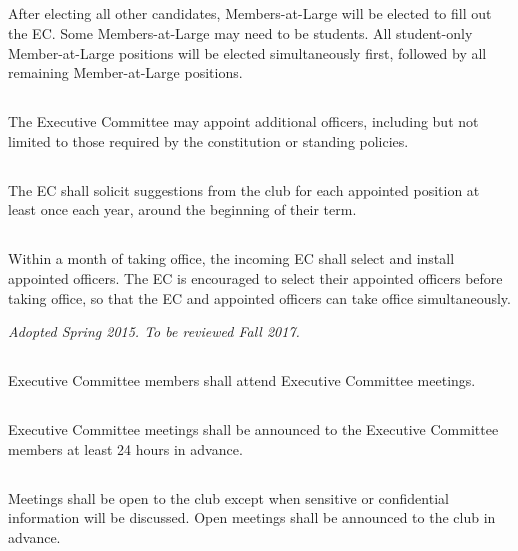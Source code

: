 \documentclass{bylaws}
\newcommand{\sptimes}[2]{\emph{Adopted #1. To be reviewed #2.}}
\begin{document}
\subsection{}After electing all other candidates, Members-at-Large will be elected to fill out the EC. Some Members-at-Large may need to be students. All student-only Member-at-Large positions will be elected simultaneously first, followed by all remaining Member-at-Large positions. 


\subsection{}The Executive Committee may appoint additional officers, including but not limited to those required by the constitution or standing policies.
\subsection{}The EC shall solicit suggestions from the club for each appointed position at least once each year, around the beginning of their term.
\subsection{}Within a month of taking office, the incoming EC shall select and install appointed officers. The EC is encouraged to select their appointed officers before taking office, so that the EC and appointed officers can take office simultaneously.


\sptimes{Spring 2015}{Fall 2017}


\subsection{}Executive Committee members shall attend Executive Committee meetings.
\subsection{}Executive Committee meetings shall be announced to the Executive Committee members at least 24 hours in advance.
\subsection{}Meetings shall be open to the club except when sensitive or confidential information will be discussed. Open meetings shall be announced to the club in advance.
\end{document}
